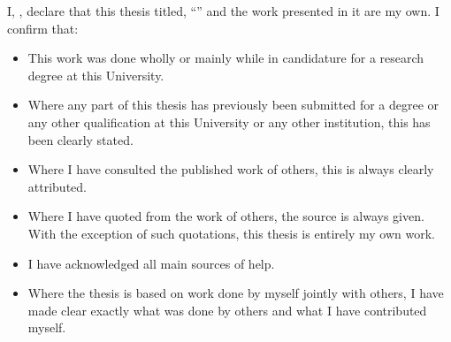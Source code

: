 
\begin{declaration}
    \addchaptertocentry{\authorshipname} %
    
    \noindent I, \authorname, declare that this thesis titled, \enquote{\ttitle} and the work presented in it are my own. I confirm that:
    
    
    \begin{itemize} 
    \item This work was done wholly or mainly while in candidature for a research degree at this University.
    \item Where any part of this thesis has previously been submitted for a degree or any other qualification at this University or any other institution, this has been clearly stated.
    \item Where I have consulted the published work of others, this is always clearly attributed.
    \item Where I have quoted from the work of others, the source is always given. With the exception of such quotations, this thesis is entirely my own work.
    \item I have acknowledged all main sources of help.
    \item Where the thesis is based on work done by myself jointly with others, I have made clear exactly what was done by others and what I have contributed myself.\\
    \end{itemize}
     
     
\end{declaration}
    
    
    
